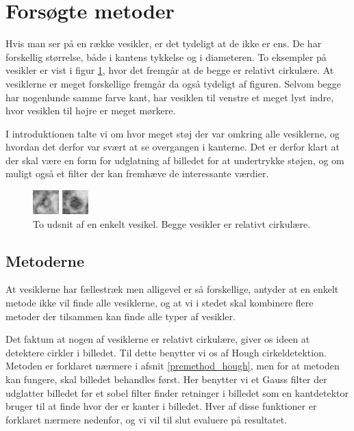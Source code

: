 \section{Forsøgte metoder}
Hvis man ser på en række vesikler, er det tydeligt at de ikke er ens. De har forskellig størrelse, både i kantens tykkelse og i diameteren. To eksempler på vesikler er vist i figur \ref{fig:premethod_ves1}, hvor det fremgår at de begge er relativt cirkulære. At vesiklerne er meget forskellige fremgår da også tydeligt af figuren. Selvom begge har nogenlunde samme farve kant, har vesiklen til venstre et meget lyst indre, hvor vesiklen til højre er meget mørkere. 

I introduktionen talte vi om hvor meget støj der var omkring alle vesiklerne, og hvordan det derfor var svært at se overgangen i kanterne. Det er derfor klart at der skal være en form for udglatning af billedet for at undertrykke støjen, og om muligt også et filter der kan fremhæve de interessante værdier.

\begin{figure}[H]
	\begin{minipage}[b]{0.5\linewidth}
		\centering
		\includegraphics[scale=5]{files/premethod/img/ves1.png}
	\end{minipage}
	\hspace{0.5cm}
	\begin{minipage}[b]{0.5\linewidth}
		\centering
		\includegraphics[scale=5]{files/premethod/img/ves2.png}
	\end{minipage}
	\caption{To udsnit af en enkelt vesikel. Begge vesikler er relativt cirkulære.\label{fig:premethod_ves1}}
\end{figure}

\subsection{Metoderne}	
At vesiklerne har fællestræk men alligevel er så forskellige, antyder at en enkelt metode ikke vil finde alle vesiklerne, og at vi i stedet skal kombinere flere metoder der tilsammen kan finde alle typer af vesikler.

Det faktum at nogen af vesiklerne er relativt cirkulære, giver os ideen at detektere cirkler i billedet. Til dette benytter vi os af Hough cirkeldetektion. Metoden er forklaret nærmere i afsnit \ref{premethod_hough}, men for at metoden kan fungere, skal billedet behandles først. Her benytter vi et Gauss filter der udglatter billedet før et sobel filter finder retninger i billedet som en kantdetektor bruger til at finde hvor der er kanter i billedet. Hver af disse funktioner er forklaret nærmere nedenfor, og vi vil til slut evaluere på resultatet.

